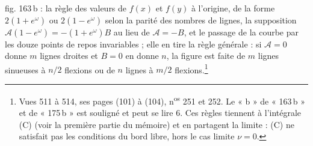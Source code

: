 \documentclass[11pt,a4paper]{article}
\begin{document}
fig. 163\,b : la règle des valeurs de $f(x)$ et $f(y)$ à l'origine, de la forme
$2(1+e^{\omega})$ ou $2(1-e^{\omega})$ selon la parité des nombres de lignes,
la supposition $\mathcal{A}(1-e^{\omega}) = -(1+e^{\omega})B$ au lieu de
$\mathcal{A} = -B$, et le passage de la courbe par les douze points de repos
invariables ; elle en tire la règle générale : si $\mathcal{A} = 0$ donne $m$
lignes droites et $B = 0$ en donne $n$, la figure est faite de $m$ lignes
sinueuses à $n/2$ flexions ou de $n$ lignes à $m/2$ flexions.\footnote{Vues 511
à 514, ses pages (101) à (104), n\textsuperscript{os} 251 et 252. Le « b » de
« 163\,b » et de « 175\,b » est souligné et peut se lire 6. Ces règles tiennent
à l'intégrale (C) (voir la première partie du mémoire) et en partagent la
limite : (C) ne satisfait pas les conditions du bord libre, hors le cas limite
$\nu = 0$.}
\end{document}
